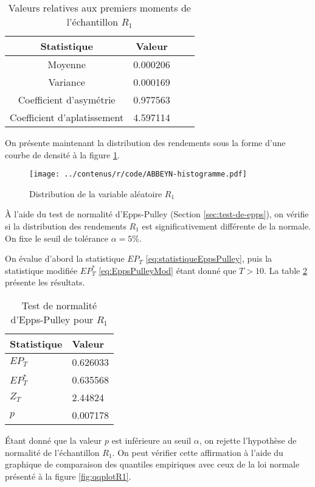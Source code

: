 \begin{table}[!ht]
  \centering
  \begin{tabular}{cccc}
    \hline
    \textbf{Statistique} & \textbf{Valeur} \\
    \hline
    Moyenne & 0.000206\\ 
    Variance & 0.000169\\ 
    Coefficient d'asymétrie & 0.977563\\ 
    Coefficient d'aplatissement & 4.597114 \\ 
    \hline
  \end{tabular}
  \caption{Valeurs relatives aux premiers moments de l'échantillon $R_1$}
  \label{tab:statmomentsR1}
\end{table}

On présente maintenant la distribution des rendements sous la forme
d'une courbe de densité à la figure \ref{fig:distributionR1}.

\begin{figure}[!ht]
  \centering
  \texttt{[image: ../contenus/r/code/ABBEYN-histogramme.pdf]}
  \caption{Distribution de la variable aléatoire $R_1$}
  \label{fig:distributionR1}
\end{figure}

À l'aide du test de normalité d'Epps-Pulley (Section
\ref{sec:test-de-epps}), on vérifie si la distribution des rendements
$R_1$ est significativement différente de la normale. On fixe le seuil
de tolérance $\alpha = 5\% $.

On évalue d'abord la statistique $EP_T$
\eqref{eq:statistiqueEppsPulley}, puis la statistique modifiée
$EP_T^{*}$ \eqref{eq:EppsPulleyMod} étant donné que $T>10$. La table
\ref{tab:eppspulleyR1} présente les résultats.

\begin{table}[!ht]
  \centering
  \begin{tabular}{ll}
    \hline
    \textbf{Statistique} & \textbf{Valeur} \\
    \hline
    $EP_T$ & 0.626033 \\
    $EP_T^{*}$ & 0.635568 \\
    $Z_T$ & 2.44824 \\
    $p$ & 0.007178 \\
    \hline
  \end{tabular}
  \caption{Test de normalité d'Epps-Pulley pour $R_1$}
  \label{tab:eppspulleyR1}
\end{table}

Étant donné que la valeur $p$ est inférieure au seuil $\alpha$, on
rejette l'hypothèse de normalité de l'échantillon $R_1$. On peut
vérifier cette affirmation à l'aide du graphique de comparaison des
quantiles empiriques avec ceux de la loi normale présenté à la figure
\ref{fig:qqplotR1}.

